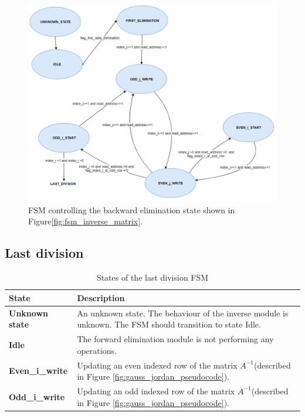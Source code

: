 \begin{figure}[H]
\centering
   \includegraphics[scale=0.5]{images/inverse_hw/fsm_backward_elimination.PNG}
  \caption{FSM controlling the backward elimination state shown in Figure\ref{fig:fsm_inverse_matrix}.  } 
  \label{fig:fsm_backward_elimination}
\end{figure}

\subsection{Last division}

\begin{table}[H]
\centering
 \resizebox{1\textwidth}{!}
{\begin{tabular}{l|l}
State                                                                                    & Description                                                                                   \\
\hline
\textbf{Unknown state}                                                                   & An unknown state. The behaviour of the inverse module is unknown. The FSM should transition to state Idle.                                    \\
\textbf{Idle}                                                                            & The forward elimination module is not performing any operations.                                          \\


\textbf{Even\_i\_write}                                                           & Updating an even indexed row of the matrix $A^{-1}$(described in Figure \ref{fig:gauss_jordan_pseudocode}).       \\
\textbf{Odd\_i\_write}                                                                  & Updating an odd indexed row of the matrix $A^{-1}$(described in Figure \ref{fig:gauss_jordan_pseudocode}).   
\end{tabular}}
\caption{States of the last division FSM}
\label{tab:fsm_last_division}

\end{table}


